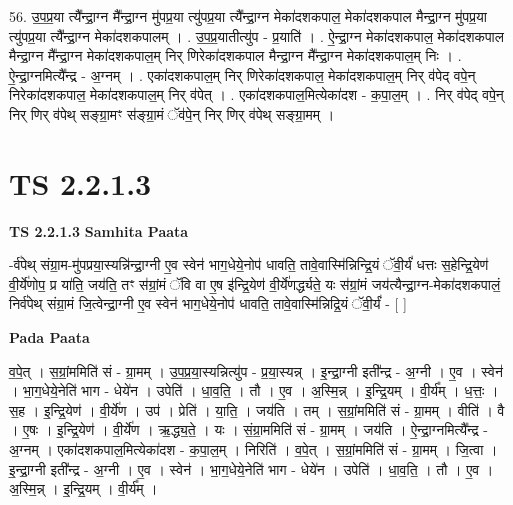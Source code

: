 \documentclass[17pt]{extarticle}
\begin{document}
56. उ॒प॒प्र॒या त्यै᳚न्द्रा॒ग्न मै᳚न्द्रा॒ग्न मु॑पप्र॒या त्यु॑पप्र॒या त्यै᳚न्द्रा॒ग्न मेका॑दशकपाल॒ मेका॑दशकपाल मैन्द्रा॒ग्न मु॑पप्र॒या त्यु॑पप्र॒या त्यै᳚न्द्रा॒ग्न मेका॑दशकपालम् । . उ॒प॒प्र॒यातीत्यु॑प - प्र॒याति॑ । . ऐ॒न्द्रा॒ग्न मेका॑दशकपाल॒ मेका॑दशकपाल मैन्द्रा॒ग्न मै᳚न्द्रा॒ग्न मेका॑दशकपाल॒म् निर् णिरेका॑दशकपाल मैन्द्रा॒ग्न मै᳚न्द्रा॒ग्न मेका॑दशकपाल॒म् निः । . ऐ॒न्द्रा॒ग्नमित्यै᳚न्द्र - अ॒ग्नम् । . एका॑दशकपाल॒म् निर् णिरेका॑दशकपाल॒ मेका॑दशकपाल॒म् निर् व॑पेद् वपे॒न् निरेका॑दशकपाल॒ मेका॑दशकपाल॒म् निर् व॑पेत् । . एका॑दशकपाल॒मित्येका॑दश - क॒पा॒ल॒म् । . निर् व॑पेद् वपे॒न् निर् णिर् व॑पेथ् सङ्ग्रा॒मꣳ स॑ङ्ग्रा॒मं ॅव॑पे॒न् निर् णिर् व॑पेथ् सङ्ग्रा॒मम् । \newline
\pagebreak
{}

\section{ TS 2.2.1.3 }

\textbf{TS 2.2.1.3 } \newline
\textbf{Samhita Paata} \newline

-र्व॑पेथ् संग्रा॒म-मु॑पप्रया॒स्यन्नि॑न्द्रा॒ग्नी ए॒व स्वेन॑ भाग॒धेये॒नोप॑ धावति॒ तावे॒वास्मि॑न्निन्द्रि॒यं ॅवी॒र्यं॑ धत्तः स॒हेन्द्रि॒येण॑ वी॒र्ये॑णोप॒ प्र या॑ति॒ जय॑ति॒ तꣳ स॑ग्रां॒मं ॅवि वा ए॒ष इ॑न्द्रि॒येण॑ वी॒र्ये॑णर्द्ध्यते॒ यः स॑ग्रां॒मं जय॑त्यैन्द्रा॒ग्न-मेका॑दशकपालं॒ निर्व॑पेथ् संग्रा॒मं जि॒त्वेन्द्रा॒ग्नी ए॒व स्वेन॑ भाग॒धेये॒नोप॑ धावति॒ तावे॒वास्मि॑न्निद्रि॒यं ॅवी॒र्यं॑ - [  ] \newline

\textbf{Pada Paata} \newline

व॒पे॒त् । स॒ग्रां॒ममिति॑ सं - ग्रा॒मम् । उ॒प॒प्र॒या॒स्यन्नित्यु॑प - प्र॒या॒स्यन्न् । इ॒न्द्रा॒ग्नी इती᳚न्द्र - अ॒ग्नी । ए॒व । स्वेन॑ । भा॒ग॒धेये॒नेति॑ भाग - धेये॑न । उपेति॑ । धा॒व॒ति॒ । तौ । ए॒व । अ॒स्मि॒न्न् । इ॒न्द्रि॒यम् । वी॒र्य᳚म् । ध॒त्तः॒ । स॒ह । इ॒न्द्रि॒येण॑ । वी॒र्ये॑ण । उप॑ । प्रेति॑ । या॒ति॒ । जय॑ति । तम् । स॒ग्रां॒ममिति॑ सं - ग्रा॒मम् । वीति॑ । वै । ए॒षः । इ॒न्द्रि॒येण॑ । वी॒र्ये॑ण । ऋ॒द्ध्य॒ते॒ । यः । सं॒ग्रा॒ममिति॑ सं - ग्रा॒मम् । जय॑ति । ऐ॒न्द्रा॒ग्नमित्यै᳚न्द्र - अ॒ग्नम् । एका॑दशकपाल॒मित्येका॑दश - क॒पा॒ल॒म् । निरिति॑ । व॒पे॒त् । स॒ग्रां॒ममिति॑ सं - ग्रा॒मम् । जि॒त्वा । इ॒न्द्रा॒ग्नी इती᳚न्द्र - अ॒ग्नी । ए॒व । स्वेन॑ । भा॒ग॒धेये॒नेति॑ भाग - धेये॑न । उपेति॑ । धा॒व॒ति॒ । तौ । ए॒व । अ॒स्मि॒न्न् । इ॒न्द्रि॒यम् । वी॒र्य᳚म् ।  \newline
\end{document}
